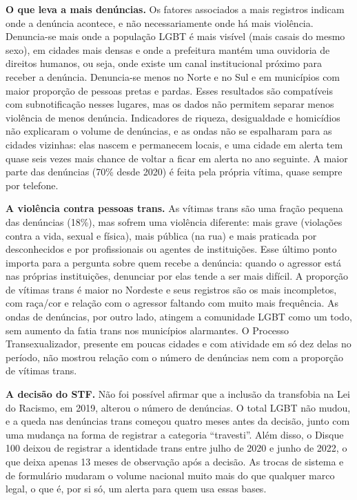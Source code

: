 \documentclass[12pt]{article}
\begin{document}
\textbf{O que leva a mais denúncias.} Os fatores associados a mais registros indicam onde a denúncia acontece, e não necessariamente onde há mais violência. Denuncia-se mais onde a população LGBT é mais visível (mais casais do mesmo sexo), em cidades mais densas e onde a prefeitura mantém uma ouvidoria de direitos humanos, ou seja, onde existe um canal institucional próximo para receber a denúncia. Denuncia-se menos no Norte e no Sul e em municípios com maior proporção de pessoas pretas e pardas. Esses resultados são compatíveis com subnotificação nesses lugares, mas os dados não permitem separar menos violência de menos denúncia. Indicadores de riqueza, desigualdade e homicídios não explicaram o volume de denúncias, e as ondas não se espalharam para as cidades vizinhas: elas nascem e permanecem locais, e uma cidade em alerta tem quase seis vezes mais chance de voltar a ficar em alerta no ano seguinte. A maior parte das denúncias (70\% desde 2020) é feita pela própria vítima, quase sempre por telefone.

\textbf{A violência contra pessoas trans.} As vítimas trans são uma fração pequena das denúncias (18\%), mas sofrem uma violência diferente: mais grave (violações contra a vida, sexual e física), mais pública (na rua) e mais praticada por desconhecidos e por profissionais ou agentes de instituições. Esse último ponto importa para a pergunta sobre quem recebe a denúncia: quando o agressor está nas próprias instituições, denunciar por elas tende a ser mais difícil. A proporção de vítimas trans é maior no Nordeste e seus registros são os mais incompletos, com raça/cor e relação com o agressor faltando com muito mais frequência. As ondas de denúncias, por outro lado, atingem a comunidade LGBT como um todo, sem aumento da fatia trans nos municípios alarmantes. O Processo Transexualizador, presente em poucas cidades e com atividade em só dez delas no período, não mostrou relação com o número de denúncias nem com a proporção de vítimas trans.

\textbf{A decisão do STF.} Não foi possível afirmar que a inclusão da transfobia na Lei do Racismo, em 2019, alterou o número de denúncias. O total LGBT não mudou, e a queda nas denúncias trans começou quatro meses antes da decisão, junto com uma mudança na forma de registrar a categoria ``travesti''. Além disso, o Disque 100 deixou de registrar a identidade trans entre julho de 2020 e junho de 2022, o que deixa apenas 13 meses de observação após a decisão. As trocas de sistema e de formulário mudaram o volume nacional muito mais do que qualquer marco legal, o que é, por si só, um alerta para quem usa essas bases.
\end{document}
